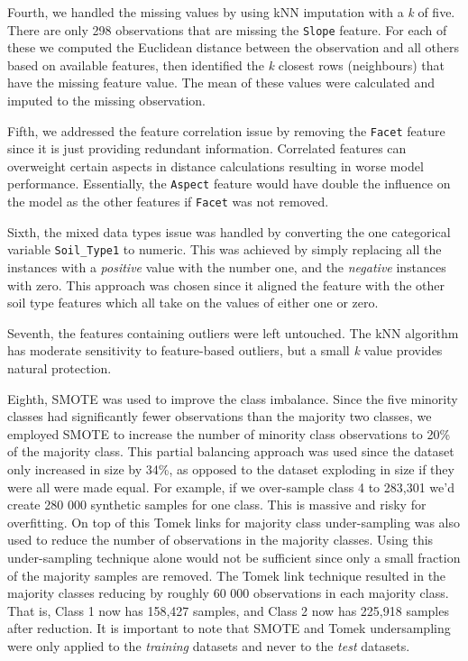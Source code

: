 \documentclass[10pt, conference]{IEEEtran}
\begin{document}
 Fourth, we handled the missing values by using kNN imputation with a \textit{k} of five. There are only 298 observations that are missing the \texttt{Slope} feature. For each of these we computed the Euclidean distance between the observation and all others based on available features, then identified the \textit{k} closest rows (neighbours) that have the missing feature value. The mean of these values were calculated and imputed to the missing observation.
 
 Fifth, we addressed the feature correlation issue by removing the \texttt{Facet} feature since it is just providing redundant information. Correlated features can overweight certain aspects in distance calculations resulting in worse model performance. Essentially, the \texttt{Aspect} feature would have double the influence on the model as the other features if \texttt{Facet} was not removed.
 
 Sixth, the mixed data types issue was handled by converting the one categorical variable \texttt{Soil\_Type1} to numeric. This was achieved by simply replacing all the instances with a \textit{positive} value with the number one, and the \textit{negative} instances with zero. This approach was chosen since it aligned the feature with the other soil type features which all take on the values of either one or zero.
 
 Seventh, the features containing outliers were left untouched. The kNN algorithm has moderate sensitivity to feature-based outliers, but a small \textit{k} value provides natural protection.
 
 Eighth, SMOTE was used to improve the class imbalance. Since the five minority classes had significantly fewer observations than the majority two classes, we employed SMOTE to increase the number of minority class observations to 20\% of the majority class. This partial balancing approach was used since the dataset only increased in size by 34\%, as opposed to the dataset exploding in size if they were all were made equal. For example, if we over-sample class 4 to 283,301 we'd create 280 000 synthetic samples for one class. This is massive and risky for overfitting. On top of this Tomek links for majority class under-sampling was also used to reduce the number of observations in the majority classes. Using this under-sampling technique alone would not be sufficient since only a small fraction of the majority samples are removed. The Tomek link technique resulted in the majority classes reducing by roughly 60 000 observations in each majority class. That is, Class 1 now has 158,427 samples, and Class 2 now has 225,918 samples after reduction.  It is important to note that SMOTE  and Tomek undersampling were only applied to the \textit{training} datasets and never to the \textit{test} datasets.
 
\end{document}
